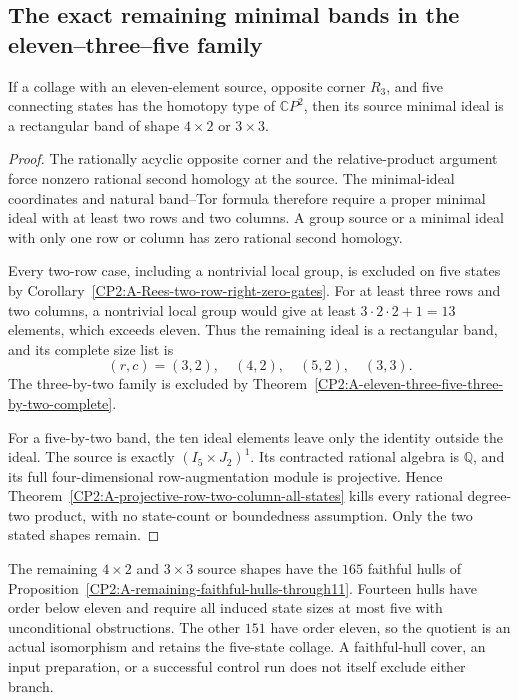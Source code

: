\subsection{The exact remaining minimal bands in the eleven--three--five family}

\begin{proposition}
\label{CP2:A-eleven-three-five-remaining-band-shapes}
If a collage with an eleven-element source, opposite corner $R_3$,
and five connecting states has the homotopy type of $\mathbb CP^2$,
then its source minimal ideal is a rectangular band of shape
$4\times2$ or $3\times3$.
\end{proposition}
\begin{proof}
The rationally acyclic opposite corner and the relative-product
argument force nonzero rational second homology at the source.
The minimal-ideal coordinates and natural band--Tor formula
therefore require a proper minimal ideal with at least two rows
and two columns.  A group source or a minimal ideal with only
one row or column has zero rational second homology.

Every two-row case, including a nontrivial local group, is
excluded on five states by
Corollary~\ref{CP2:A-Rees-two-row-right-zero-gates}.
For at least three rows and two columns, a nontrivial local
group would give at least $3\cdot2\cdot2+1=13$ elements,
which exceeds eleven.  Thus the remaining ideal is a
rectangular band, and its complete size list is
\[
 (r,c)=(3,2),\quad(4,2),\quad(5,2),\quad(3,3).
\]
The three-by-two family is excluded by
Theorem~\ref{CP2:A-eleven-three-five-three-by-two-complete}.

For a five-by-two band, the ten ideal elements leave only
the identity outside the ideal.  The source is exactly
$(I_5\times J_2)^1$.  Its contracted rational algebra is
$\mathbb Q$, and its full four-dimensional row-augmentation
module is projective.  Hence
Theorem~\ref{CP2:A-projective-row-two-column-all-states}
kills every rational degree-two product, with no state-count
or boundedness assumption.  Only the two stated shapes remain.
\end{proof}

\begin{remark*}
The remaining $4\times2$ and $3\times3$ source shapes have the
$165$ faithful hulls of
Proposition~\ref{CP2:A-remaining-faithful-hulls-through11}.
Fourteen hulls have order below eleven and require all induced
state sizes at most five with unconditional obstructions.
The other $151$ have order eleven, so the quotient is an actual
isomorphism and retains the five-state collage.  A faithful-hull
cover, an input preparation, or a successful control run does
not itself exclude either branch.
\end{remark*}
